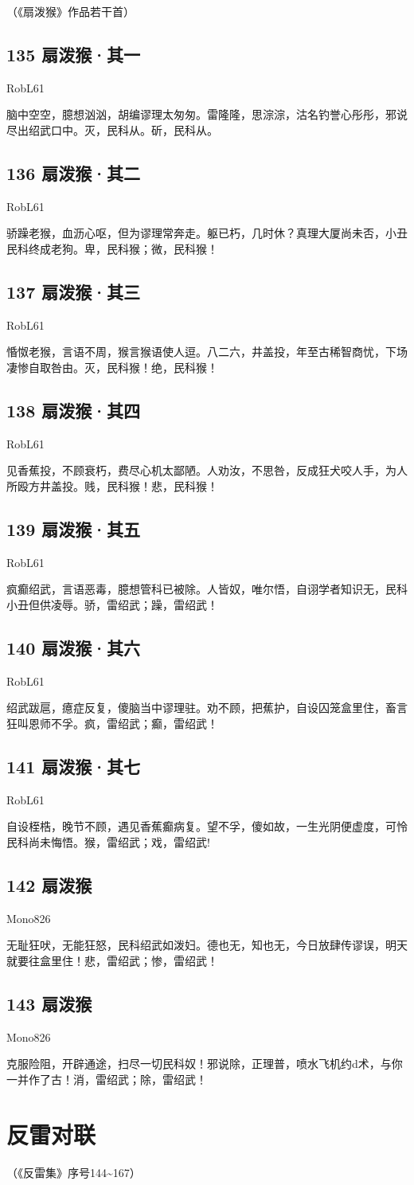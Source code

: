 \documentclass[UTF8,12pt,oneside]{ctexbook}
\def\pau#1{\begin{center} {#1} \end{center}} %
\def\poem#1#2{\section{#1}\pau{#2}} %
\begin{document}
\begin{center}
    （《扇泼猴》作品若干首）
\end{center}

\poem{135 扇泼猴·其一}{RobL61}

脑中空空，臆想汹汹，胡编谬理太匆匆。雷隆隆，思淙淙，沽名钓誉心彤彤，邪说尽出绍武口中。灭，民科从。斫，民科从。
~\\

\poem{136 扇泼猴·其二}{RobL61}

骄躁老猴，血沥心呕，但为谬理常奔走。躯已朽，几时休？真理大厦尚未否，小丑民科终成老狗。卑，民科猴；微，民科猴！

\newpage

\poem{137 扇泼猴·其三}{RobL61}

惛怓老猴，言语不周，猴言猴语使人逗。八二六，井盖投，年至古稀智商忧，下场凄惨自取咎由。灭，民科猴！绝，民科猴！

\poem{138 扇泼猴·其四}{RobL61}

见香蕉投，不顾衰朽，费尽心机太鄙陋。人劝汝，不思咎，反成狂犬咬人手，为人所殴方井盖投。贱，民科猴！悲，民科猴！

\poem{139 扇泼猴·其五}{RobL61}

疯癫绍武，言语恶毒，臆想管科已被除。人皆奴，唯尔悟，自诩学者知识无，民科小丑但供凌辱。骄，雷绍武；躁，雷绍武！

\poem{140 扇泼猴·其六}{RobL61}

绍武跋扈，癔症反复，傻脑当中谬理驻。劝不顾，把蕉护，自设囚笼盒里住，畜言狂叫恩师不孚。疯，雷绍武；癫，雷绍武！

\newpage

\poem{141 扇泼猴·其七}{RobL61}

自设桎梏，晚节不顾，遇见香蕉癫病复。望不孚，傻如故，一生光阴便虚度，可怜民科尚未悔悟。猴，雷绍武；戏，雷绍武!
~\\

\poem{142 扇泼猴}{Mono826}

无耻狂吠，无能狂怒，民科绍武如泼妇。德也无，知也无，今日放肆传谬误，明天就要往盒里住！悲，雷绍武；惨，雷绍武！
~\\

\poem{143 扇泼猴}{Mono826}

克服险阻，开辟通途，扫尽一切民科奴！邪说除，正理普，喷水飞机约d术，与你一并作了古！消，雷绍武；除，雷绍武！

\chapter{反雷对联}
\begin{center}
    （《反雷集》序号144\textasciitilde167）
\end{center}
\end{document}
